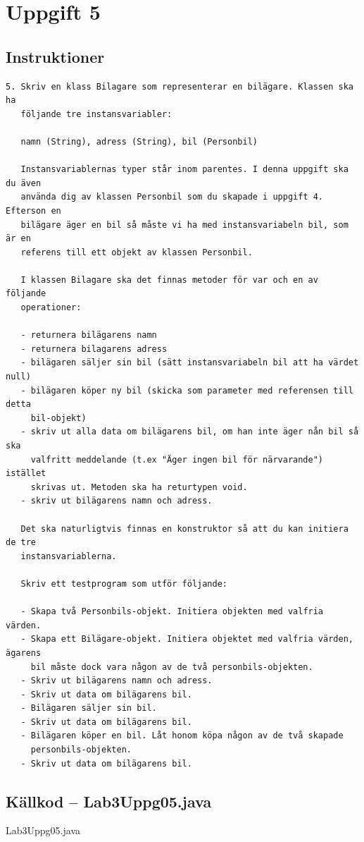 \section{Uppgift 5}\label{sec:uppg05}

\subsection{Instruktioner}
\begin{verbatim}
5. Skriv en klass Bilagare som representerar en bilägare. Klassen ska ha
   följande tre instansvariabler:
   
   namn (String), adress (String), bil (Personbil)
   
   Instansvariablernas typer står inom parentes. I denna uppgift ska du även
   använda dig av klassen Personbil som du skapade i uppgift 4. Efterson en
   bilägare äger en bil så måste vi ha med instansvariabeln bil, som är en
   referens till ett objekt av klassen Personbil.
   
   I klassen Bilagare ska det finnas metoder för var och en av följande
   operationer:
   
   - returnera bilägarens namn
   - returnera bilagarens adress
   - bilägaren säljer sin bil (sätt instansvariabeln bil att ha värdet null)
   - bilägaren köper ny bil (skicka som parameter med referensen till detta
     bil-objekt)
   - skriv ut alla data om bilägarens bil, om han inte äger nån bil så ska
     valfritt meddelande (t.ex "Äger ingen bil för närvarande") istället
     skrivas ut. Metoden ska ha returtypen void.
   - skriv ut bilägarens namn och adress.
   
   Det ska naturligtvis finnas en konstruktor så att du kan initiera de tre
   instansvariablerna.
   
   Skriv ett testprogram som utför följande:
   
   - Skapa två Personbils-objekt. Initiera objekten med valfria värden.
   - Skapa ett Bilägare-objekt. Initiera objektet med valfria värden, ägarens
     bil måste dock vara någon av de två personbils-objekten.
   - Skriv ut bilägarens namn och adress.
   - Skriv ut data om bilägarens bil.
   - Bilägaren säljer sin bil.
   - Skriv ut data om bilägarens bil.
   - Bilägaren köper en bil. Låt honom köpa någon av de två skapade
     personbils-objekten.
   - Skriv ut data om bilägarens bil.
\end{verbatim}


\subsection{Källkod -- Lab3Uppg05.java}
\caption{Lab3Uppg05.java}
\label{src:uppg05}


